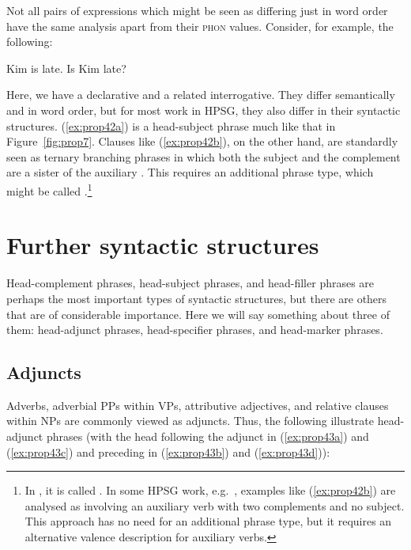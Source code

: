 \documentclass[output=paper
	        ,collection
	        ,collectionchapter
 	        ,biblatex
                ,babelshorthands
                ,newtxmath
                ,draftmode
                ,colorlinks, citecolor=brown
]{langscibook}
\begin{document}
Not all pairs of expressions which might be seen as differing just in word order have the same
analysis apart from their \textsc{phon} values.\label{page-properties:aux-inversion} Consider, for example, the following:

\eal\label{ex:prop42}
\ex\label{ex:prop42a}
Kim is late.
\ex\label{ex:prop42b}
Is Kim late?
\zl

\noindent
Here, we have a declarative and a related interrogative. They differ semantically and in word order,
but for most work in HPSG, they also differ in their syntactic structures. (\ref{ex:prop42a}) is a
head-subject phrase much like that in Figure~\ref{fig:prop7}. Clauses like (\ref{ex:prop42b}), on
the other hand, are standardly seen as ternary branching phrases in which both the subject and the
complement are a sister of the auxiliary \citep[40]{ps2}. This requires an additional phrase type,
which might be called .\footnote{In \citet[36]{GSag2000a-u}, it
  is called . In some HPSG work, e.g.\ \citet[409--414]{SWB2003a}, examples like
  (\ref{ex:prop42b}) are analysed as involving an auxiliary verb with two complements and no
  subject. This approach has no need for an additional phrase type, but it requires an alternative
  valence description for auxiliary verbs.}
%


\section{Further syntactic structures}\label{sec:prop6}
\label{prop:sec-further-syntactic-structures}

Head-complement phrases, head-subject phrases, and head-filler phrases are perhaps the most important types of syntactic structures, but there are others that are of considerable importance. Here we will say something about three of them: head-adjunct phrases, head-specifier phrases, and head-marker phrases.

\subsection{Adjuncts}\label{sec:prop6.1}

Adverbs, adverbial PPs within VPs, attributive adjectives, and relative clauses within NPs are commonly viewed as adjuncts. Thus, the following illustrate head-adjunct phrases (with the head following the adjunct in (\ref{ex:prop43a}) and (\ref{ex:prop43c}) and preceding in (\ref{ex:prop43b}) and (\ref{ex:prop43d})):
\end{document}
